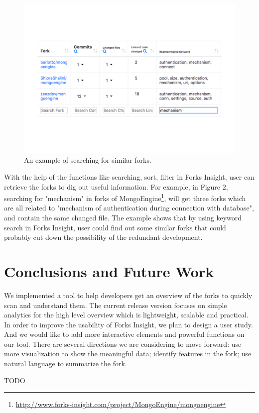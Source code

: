 \begin{figure}[]
\centering
\includegraphics[scale=0.3]{pic5.pdf}
\caption{An example of searching for similar forks.}
\vspace{-12pt}
\end{figure}

With the help of the functions like searching, sort, filter in Forks Insight, user can retrieve the forks to dig out useful information. For example, in Figure 2, searching for "mechanism" in forks of MongoEngine\footnote{\url{http://www.forks-insight.com/project/MongoEngine/mongoengine}}, will get three forks which are all related to "mechanism of authentication during connection with database", and contain the same changed file. The example shows that by using keyword search in Forks Insight, user could find out some similar forks that could probably cut down the possibility of the redundant development.

\section{Conclusions and Future Work}
We implemented a tool to help developers get an overview of the forks to quickly scan and understand them. The current release version focuses on simple analytics for the high level overview which is lightweight, scalable and practical. In order to improve the usability of Forks Insight, we plan to design a user study. And we would like to add more interactive elements and powerful functions on our tool. There are several directions we are considering to move forward: use more visualization to show the meaningful data; identify features in the fork; use natural language to summarize the fork.

\begin{acks}
  TODO
\end{acks}



